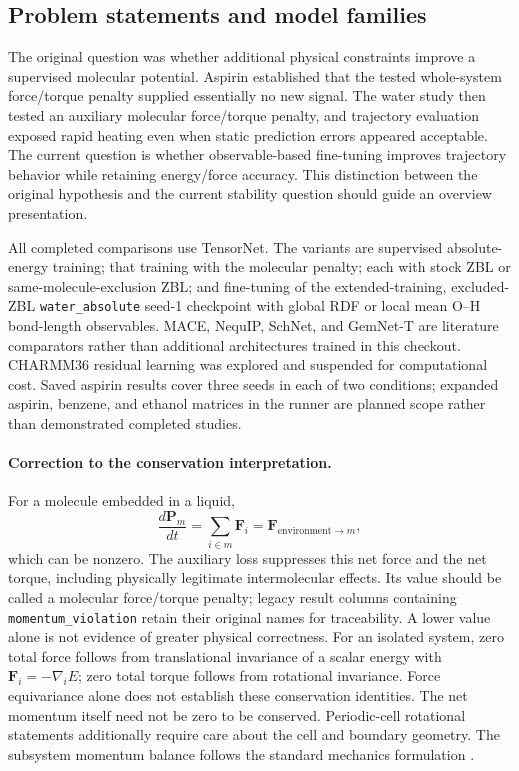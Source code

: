 \documentclass[11pt]{article}
\begin{document}
\subsection{Problem statements and model families}

The original question was whether additional physical constraints improve
a supervised molecular potential. Aspirin established that the tested
whole-system force/torque penalty supplied essentially no new signal.
The water study then tested an auxiliary molecular force/torque penalty,
and trajectory evaluation exposed rapid heating even when static prediction
errors appeared acceptable. The current question is whether observable-based
fine-tuning improves trajectory behavior while retaining energy/force
accuracy. This distinction between the original hypothesis and the current
stability question should guide an overview presentation.

All completed comparisons use TensorNet. The variants are supervised
absolute-energy training; that training with the molecular penalty; each
with stock ZBL or same-molecule-exclusion ZBL; and fine-tuning of the
extended-training, excluded-ZBL \texttt{water\_absolute} seed-1 checkpoint
with global RDF or local mean O--H bond-length observables. MACE, NequIP,
SchNet, and GemNet-T are literature comparators rather than additional
architectures trained in this checkout. CHARMM36 residual learning was
explored and suspended for computational cost. Saved aspirin results cover
three seeds in each of two conditions; expanded aspirin, benzene, and
ethanol matrices in the runner are planned scope rather than demonstrated
completed studies.

\paragraph{Correction to the conservation interpretation.}
For a molecule embedded in a liquid,
\begin{equation}
\frac{d\mathbf P_m}{dt}=\sum_{i\in m}\mathbf F_i
=\mathbf F_{\mathrm{environment}\to m},
\end{equation}
which can be nonzero. The auxiliary loss suppresses this net force and the
net torque, including physically legitimate intermolecular effects. Its
value should be called a molecular force/torque penalty; legacy result
columns containing \texttt{momentum\_violation} retain their original
names for traceability. A lower value alone is not evidence of greater
physical correctness. For an isolated system, zero total force follows
from translational invariance of a scalar energy with
$\mathbf F_i=-\nabla_i E$; zero total torque follows from rotational
invariance. Force equivariance alone does not establish these conservation
identities. The net momentum itself need not be zero to be conserved.
Periodic-cell rotational statements additionally require care about the
cell and boundary geometry. The subsystem momentum balance follows the
standard mechanics formulation \citep{momentum-review-source}.
\end{document}
